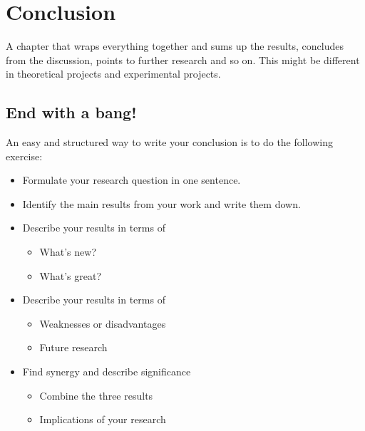 \chapter{Conclusion}
\label{conc}

A chapter that wraps everything together and sums up the results, concludes from the discussion, points to further research and so on. This might be different in theoretical projects and experimental projects.

\section{End with a bang!}
An easy and structured way to write your conclusion is to do the following exercise:
\begin{itemize}
\item Formulate your research question in one sentence.
\item Identify the main results from your work and write them down.
\item Describe your results in terms of
\begin{itemize}
    \item What’s new?
\item What’s great?
\end{itemize}
\item Describe your results in terms of
\begin{itemize}
    \item Weaknesses or disadvantages
\item Future research
\end{itemize}
\item Find synergy and describe significance
\begin{itemize}
    \item Combine the three results
\item Implications of your research  
\end{itemize}
\end{itemize}

